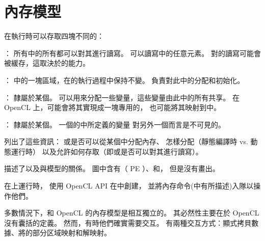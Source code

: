 
\section{內存模型}
在執行時可以存取四塊不同的：

\startigBase
\item {}：
所有中的所有都可以對其進行讀寫。
可以讀寫中的任意元素。
對的讀寫可能會被緩存，這取決於的能力。

\item {}：
中的一塊區域，在的執行過程中保持不變。
負責對此中的分配和初始化。

\item {}：
隸屬於某個。
可以用來分配一些變量，這些變量由此中的所有共享。
在 OpenCL 上，可能會將其實現成一塊專用的，
也可能將其映射到中。

\item {}：
隸屬於某個。
一個的中所定義的變量
對另外一個而言是不可見的。
\stopigBase

列出了這些資訊：
或是否可以從某個中分配內存、
怎樣分配（靜態編譯時 vs. 動態運行時）
以及允許如何存取（即或是否可以對其進行讀寫）。


描述了以及與模型的關係。
圖中含有（ PE ）、和，
但是沒有畫出。

{}

在上運行時，
使用 OpenCL API 在中創建，
並將內存命令(中有所描述)入隊以操作他們。

多數情況下，和 OpenCL 的內存模型是相互獨立的。
其必然性主要在於 OpenCL 沒有囊括的定義。
然而，有時他們確實需要交互。
有兩種交互方式：顯式拷貝數據、將的部分区域映射和解映射。

